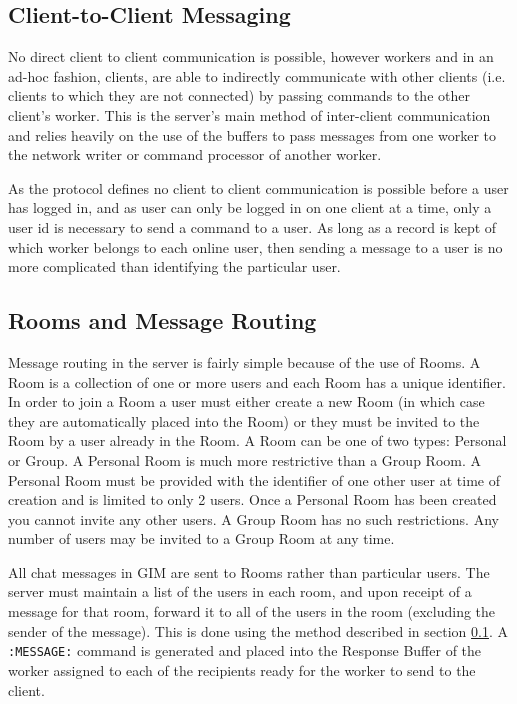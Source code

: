 \subsection{Client-to-Client Messaging}
\label{c2c}
No direct client to client communication is possible, however workers and in an ad-hoc fashion, clients, are able to indirectly communicate with other clients (i.e. clients to which they are not connected) by passing commands to the other client's worker. This is the server's main method of inter-client communication and relies heavily on the use of the buffers to pass messages from one worker to the network writer or command processor of another worker.

As the protocol defines no client to client communication is possible before a user has logged in, and as user can only be logged in on one client at a time, only a user id is necessary to send a command to a user. As long as a record is kept of which worker belongs to each online user, then sending a message to a user is no more complicated than identifying the particular user.

\subsection{Rooms and Message Routing}
\label{message_routing}

Message routing in the server is fairly simple because of the use of Rooms. A Room is a collection of one or more users and each Room has a unique identifier. In order to join a Room a user must either create a new Room (in which case they are automatically placed into the Room) or they must be invited to the Room by a user already in the Room. A Room can be one of two types: Personal or Group. A Personal Room is much more restrictive than a Group Room. A Personal Room must be provided with the identifier of one other user at time of creation and is limited to only 2 users. Once a Personal Room has been created you cannot invite any other users. A Group Room has no such restrictions. Any number of users may be invited to a Group Room at any time.

All chat messages in GIM are sent to Rooms rather than particular users. The server must maintain a list of the users in each room, and upon receipt of a message for that room, forward it to all of the users in the room (excluding the sender of the message). This is done using the method described in section \ref{c2c}. A \texttt{:MESSAGE:} command is generated and placed into the Response Buffer of the worker assigned to each of the recipients ready for the worker to send to the client.

